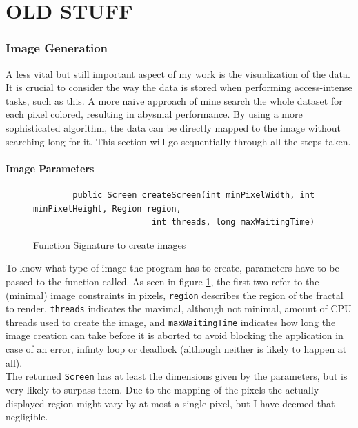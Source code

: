 \documentclass[10pt,a4paper,titlepage]{article}
\begin{document}
	
	
	
	
	
	
	
	
	
	
	
	
	
	
	
	
	
	
	
	
	
	
	\iffalse%
	\section{OLD STUFF}
	\subsubsection{Image Generation}
	A less vital but still important aspect of my work is the visualization of the data. It is crucial to consider the way the data is stored when performing access-intense tasks, such as this. A more naive approach of mine search the whole dataset for each pixel colored, resulting in abysmal performance. By using a more sophisticated algorithm, the data can be directly mapped to the image without searching long for it. This section will go sequentially through all the steps taken.
	\paragraph{Image Parameters}
	\begin{figure}
		\centering
		\caption{Function Signature to create images}
		\label{fig:image_signature}
		\begin{verbatim}
		public Screen createScreen(int minPixelWidth, int minPixelHeight, Region region,
		                int threads, long maxWaitingTime)
		\end{verbatim}
	\end{figure}
	To know what type of image the program has to create, parameters have to be passed to the function called. As seen in figure \ref{fig:image_signature}, the first two refer to the (minimal) image constraints in pixels, \verb|region| describes the region of the fractal to render. \verb|threads| indicates the maximal, although not minimal, amount of CPU threads used to create the image, and \verb|maxWaitingTime| indicates how long the image creation can take before it is aborted to avoid blocking the application in case of an error, infinty loop or deadlock (although neither is likely to happen at all).\\
	The returned \verb|Screen| has at least the dimensions given by the parameters, but is very likely to surpass them. Due to the mapping of the pixels the actually displayed region might vary by at most a single pixel, but I have deemed that negligible.	
\end{document}
